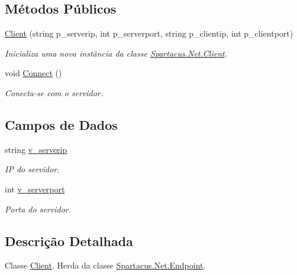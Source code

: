 \subsection*{Métodos Públicos}
\begin{DoxyCompactItemize}
\item 
\hyperlink{classSpartacus_1_1Net_1_1Client_afa4cd6215e9bd4c7e3e6c3591d7371ad}{Client} (string p\+\_\+serverip, int p\+\_\+serverport, string p\+\_\+clientip, int p\+\_\+clientport)
\begin{DoxyCompactList}\small\item\em Inicializa uma nova instância da classe \hyperlink{classSpartacus_1_1Net_1_1Client}{Spartacus.\+Net.\+Client}. \end{DoxyCompactList}\item 
void \hyperlink{classSpartacus_1_1Net_1_1Client_a41150c9013d1df7027a917e856dac124}{Connect} ()
\begin{DoxyCompactList}\small\item\em Conecta-\/se com o servidor. \end{DoxyCompactList}\end{DoxyCompactItemize}
\subsection*{Campos de Dados}
\begin{DoxyCompactItemize}
\item 
string \hyperlink{classSpartacus_1_1Net_1_1Client_ae9fb9ee5ccfc9c3efb16681a27675ea1}{v\+\_\+serverip}
\begin{DoxyCompactList}\small\item\em I\+P do servidor. \end{DoxyCompactList}\item 
int \hyperlink{classSpartacus_1_1Net_1_1Client_a70320e8d8b4e08aac5a55a636666d12c}{v\+\_\+serverport}
\begin{DoxyCompactList}\small\item\em Porta do servidor. \end{DoxyCompactList}\end{DoxyCompactItemize}


\subsection{Descrição Detalhada}
Classe \hyperlink{classSpartacus_1_1Net_1_1Client}{Client}. Herda da classe \hyperlink{classSpartacus_1_1Net_1_1Endpoint}{Spartacus.\+Net.\+Endpoint}. 



